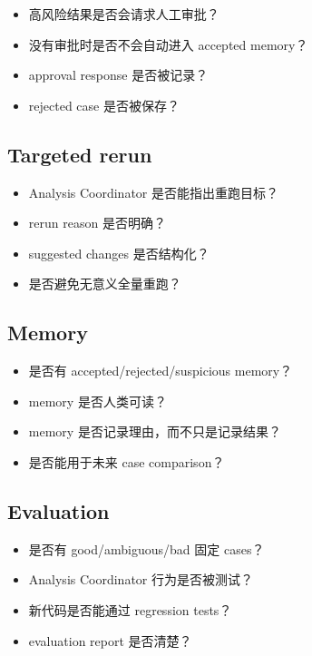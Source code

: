 \documentclass[11pt,a4paper,fontset=none]{ctexart}
\begin{document}
\begin{itemize}[leftmargin=2em]
  \item 高风险结果是否会请求人工审批？
  \item 没有审批时是否不会自动进入 accepted memory？
  \item approval response 是否被记录？
  \item rejected case 是否被保存？
\end{itemize}

\subsection{Targeted rerun}

\begin{itemize}[leftmargin=2em]
  \item Analysis Coordinator 是否能指出重跑目标？
  \item rerun reason 是否明确？
  \item suggested changes 是否结构化？
  \item 是否避免无意义全量重跑？
\end{itemize}

\subsection{Memory}

\begin{itemize}[leftmargin=2em]
  \item 是否有 accepted/rejected/suspicious memory？
  \item memory 是否人类可读？
  \item memory 是否记录理由，而不只是记录结果？
  \item 是否能用于未来 case comparison？
\end{itemize}

\subsection{Evaluation}

\begin{itemize}[leftmargin=2em]
  \item 是否有 good/ambiguous/bad 固定 cases？
  \item Analysis Coordinator 行为是否被测试？
  \item 新代码是否能通过 regression tests？
  \item evaluation report 是否清楚？
\end{itemize}
\end{document}
